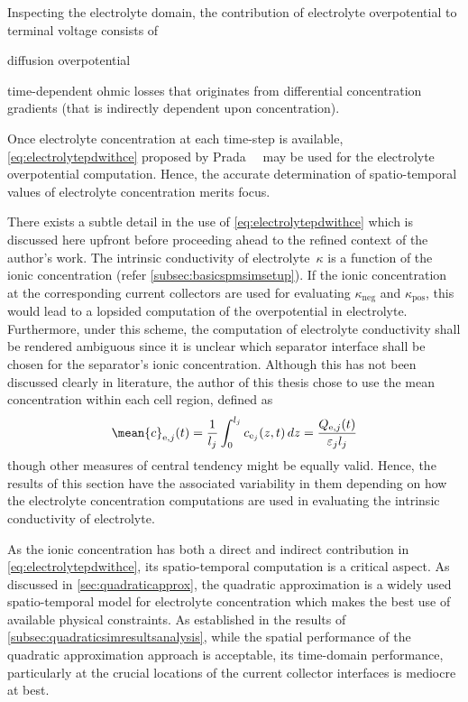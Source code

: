Inspecting the electrolyte domain, the contribution of electrolyte overpotential
to  terminal  voltage   consists  of
\begin{enumerate*}[label=\emph{\alph*})]
    \item diffusion   overpotential
    \item time-dependent   ohmic  losses   that  originates   from  differential concentration  gradients  (that  is   indirectly  dependent  upon
concentration).
\end{enumerate*}
Once       electrolyte        concentration       at        each       time-step
is         available, \cref{eq:electrolytepdwithce}          proposed         by
Prada~\etal~\cite{Prada2012}  may  be  used for  the  electrolyte  overpotential
computation.  Hence, the  accurate  determination of  spatio-temporal values  of
electrolyte concentration merits focus.

There exists a  subtle detail in the  use of \cref{eq:electrolytepdwithce} which
is discussed here upfront before proceeding  ahead to the refined context of the
author's work. The intrinsic conductivity of electrolyte~$\kappa$ is a function
of the ionic concentration  (refer \cref{subsec:basicspmsimsetup}). If the ionic
concentration at  the corresponding current  collectors are used  for evaluating
$\kappa_\text{neg}$  and  $\kappa_\text{pos}$, this  would  lead  to a  lopsided
computation of the overpotential in electrolyte. Furthermore, under this scheme,
the computation of electrolyte conductivity shall be rendered ambiguous since it
is unclear which  separator interface shall be chosen for  the separator's ionic
concentration. Although this  has not been discussed clearly  in literature, the
author  of this  thesis chose  to use  the mean  concentration within  each cell
region, defined as
\begin{equation}
    \mean{c}_{\text{e},j}(t) = \frac{1}{l_j}\int_0^{l_j} c_{\text{e}_j}(z,t)\, dz = \frac{Q_{\text{e,}j}(t)}{\varepsilon_j l_j}
\end{equation}
though other  measures of central  tendency might  be equally valid.  Hence, the
results of this section have the associated variability in them depending on how
the electrolyte concentration computations are  used in evaluating the intrinsic
conductivity of electrolyte.

As  the  ionic  concentration  has  both  a  direct  and  indirect  contribution
in \cref{eq:electrolytepdwithce}, its spatio-temporal  computation is a critical
aspect. As discussed  in \cref{sec:quadraticapprox}, the quadratic approximation
is a widely used spatio-temporal model for electrolyte concentration which makes
the best  use of available physical  constraints. As established in  the results
of \cref{subsec:quadraticsimresultsanalysis}, while  the spatial  performance of
the quadratic approximation approach is acceptable, its time-domain performance,
particularly at  the crucial  locations of the  current collector  interfaces is
mediocre at best.

